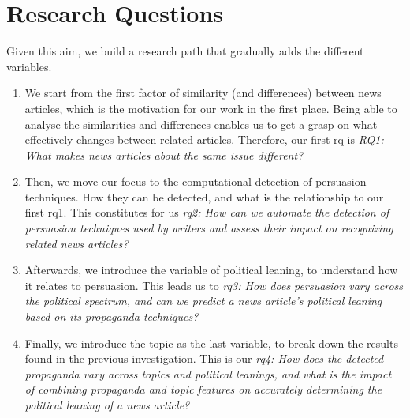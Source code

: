 






\section{\statusorange Research Questions}
\label{sec:intro_rqs}

Given this aim, we build a research path that gradually adds the different variables.

\begin{enumerate}
    \item We start from the first factor of similarity (and differences) between news articles, which is the motivation for our work in the first place. Being able to analyse the similarities and differences enables us to get a grasp on what effectively changes between related articles. Therefore, our first \acrfull{rq} is \emph{RQ1: What makes news articles about the same issue different?}
    \item Then, we move our focus to the computational detection of persuasion techniques. How they can be detected, and what is the relationship to our first \acrshort{rq}1. This constitutes for us \emph{\acrshort{rq}2: How can we automate the detection of persuasion techniques used by writers and assess their impact on recognizing related news articles?} 
    \item Afterwards, we introduce the variable of political leaning, to understand how it relates to persuasion. This leads us to \emph{\acrshort{rq}3: How does persuasion vary across the political spectrum, and can we predict a news article's political leaning based on its propaganda techniques?}
    \item Finally, we introduce the topic as the last variable, to break down the results found in the previous investigation. This is our \emph{\acrshort{rq}4: How does the detected propaganda vary across topics and political leanings, and what is the impact of combining propaganda and topic features on accurately determining the political leaning of a news article?}
\end{enumerate}

